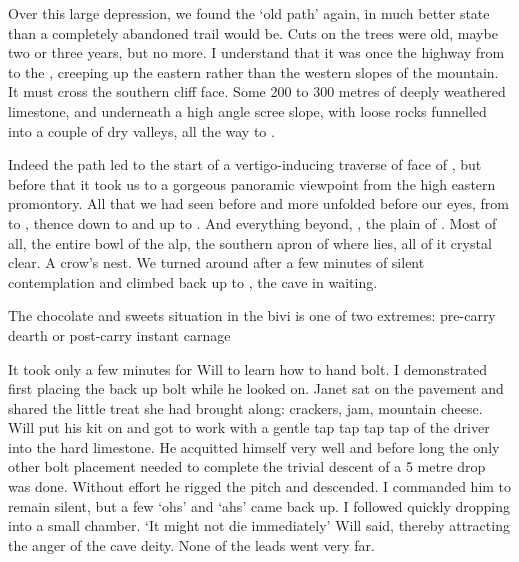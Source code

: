 Over this large depression, we found the `old  path' again, in much better state than a completely abandoned trail would be. Cuts on the trees were old, maybe two or three years, but no more. I understand that it was once the highway from  to the , creeping up the eastern rather than the western slopes of the mountain. It must cross the  southern cliff face. Some 200 to 300 metres of deeply weathered limestone, and underneath a high angle scree slope, with loose rocks funnelled into a couple of dry valleys, all the way to . 

Indeed the path led to the start of a vertigo-inducing traverse of face of , but before that it took us to a gorgeous panoramic viewpoint from the high eastern promontory. All that we had seen before and more unfolded before our eyes, from  to , thence down to  and up to . And everything beyond, , the plain of . Most of all, the entire bowl of the  alp, the southern apron of  where  lies, all of it crystal clear. A crow's nest. We turned around after a few minutes of silent contemplation and climbed back up to , the cave in waiting. 

\begin{marginfigure}
\centering
{}
\label{chocolate}
\caption{The chocolate and sweets situation in the bivi is one of two extremes: pre-carry dearth or post-carry instant carnage }
\end{marginfigure}

It took only a few minutes for Will to learn how to hand bolt. I demonstrated first placing the back up bolt while he looked on. Janet sat on the pavement and shared the little treat she had brought along: crackers, jam, mountain cheese. Will put his kit on and got to work with a gentle tap tap tap tap  of the driver into the hard limestone. He acquitted himself very well and before long the only other bolt placement needed to complete the trivial descent of a 5 metre drop was done. Without effort he rigged the pitch and descended. I commanded him to remain silent, but a few `ohs' and `ahs' came back up. I followed quickly dropping into a small chamber.
`It might not die immediately' Will said, thereby attracting the anger of the cave deity. None of the leads went very far. 


